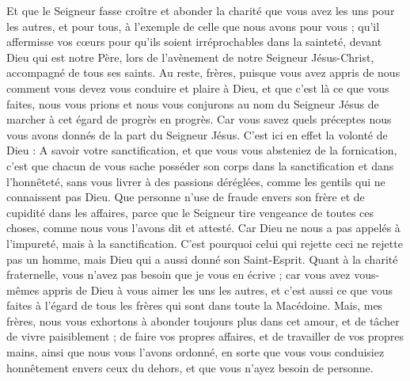 \begin{multicols}{2}
Et que le Seigneur fasse croître et abonder la charité que vous avez les uns pour les autres, et pour tous, à l’exemple de celle que nous avons pour vous ;
qu’il affermisse vos cœurs pour qu’ils soient irréprochables dans la sainteté, devant Dieu qui est notre Père, lors de l’avènement de notre Seigneur Jésus-Christ, accompagné de tous ses saints.
\VerseOne{}Au reste, frères, puisque vous avez appris de nous comment vous devez vous conduire et plaire à Dieu, et que c’est là ce que vous faites, nous vous prions et nous vous conjurons au nom du Seigneur Jésus de marcher à cet égard de progrès en progrès.
Car vous savez quels préceptes nous vous avons donnés de la part du Seigneur Jésus.
C’est ici en effet la volonté de Dieu : A savoir votre sanctification, et que vous vous absteniez de la fornication,
c’est que chacun de vous sache posséder son corps dans la sanctification et dans l’honnêteté,
sans vous livrer à des passions déréglées, comme les gentils qui ne connaissent pas Dieu.
Que personne n’use de fraude envers son frère et de cupidité dans les affaires, parce que le Seigneur tire vengeance de toutes ces choses, comme nous vous l’avons dit et attesté.
Car Dieu ne nous a pas appelés à l’impureté, mais à la sanctification.
C'est pourquoi celui qui rejette ceci ne rejette pas un homme, mais Dieu qui a aussi donné son Saint-Esprit.
Quant à la charité fraternelle, vous n'avez pas besoin que je vous en écrive ; car vous avez vous-mêmes appris de Dieu à vous aimer les uns les autres,
et c'est aussi ce que vous faites à l'égard de tous les frères qui sont dans toute la Macédoine. Mais, mes frères, nous vous exhortons à abonder toujours plus dans cet amour,
et de tâcher de vivre paisiblement ; de faire vos propres affaires, et de travailler de vos propres mains, ainsi que nous vous l'avons ordonné,
en sorte que vous vous conduisiez honnêtement envers ceux du dehors, et que vous n'ayez besoin de personne.

\end{multicols}
